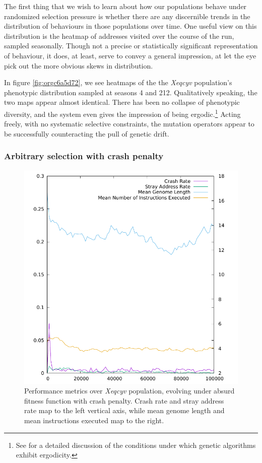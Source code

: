 \documentclass[12pt,glossary]{dalthesis}
\begin{document}
The first thing that we wish to learn about how our populations behave under
randomized selection pressure is whether there are any discernible 
trends in the distribution of behaviours in those populations over time. 
One useful view on this distribution is the heatmap of addresses visited over the
course of the run, sampled seasonally. Though not a precise or statistically
significant representation of behaviour, it does, at least, serve to convey a
general impression, at let the eye pick out the more obvious skews in distribution. 

In figure \ref{fig:orgc6a5d72}, we see heatmaps of the the \emph{Xeqcyv} population's
phenotypic distribution sampled at seasons 4 and 212. Qualitatively speaking, the
two maps appear almost identical. There has been no collapse of phenotypic diversity,
and the system even gives the impression of being ergodic.\footnote{See \cite{schmitt01} for a detailed discussion of the conditions under which genetic algorithms exhibit ergodicity.} Acting freely, with
no systematic selective constraints, the mutation operators appear to be successfully
counteracting the pull of genetic drift. 


\subsubsection{Arbitrary selection with crash penalty}
\label{sec:orgc7f1f11}
\label{org010a5d3}

\begin{figure}[htbp]
\centering
\includegraphics[width=.9\linewidth]{../images/plots/xeqcyv_kafka_performance.pdf}
\caption{\label{fig:org61a173a}
Performance metrics over \emph{Xeqcyv} population, evolving under absurd fitness function with crash penalty. Crash rate and stray address rate map to the left vertical axis, while mean genome length and mean instructions executed map to the right.}
\end{figure}
\end{document}
